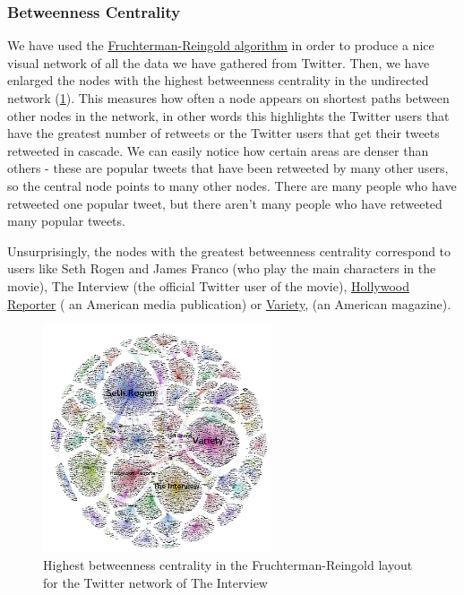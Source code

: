 \documentclass{llncs}
\begin{document}
\subsubsection{Betweenness Centrality}
We have used the
\href{https://en.wikipedia.org/wiki/Force-directed_graph_drawing}{Fruchterman-Reingold
algorithm} in order to produce a nice visual network of all the data we have
gathered from Twitter. Then, we have enlarged the nodes with the highest
betweenness centrality in the undirected network
(\ref{fig:interview-twitter-betweennes-centrality}). This measures how often a
node appears on shortest paths between other nodes in the network, in other
words this highlights the Twitter users that have the greatest number of
retweets or the Twitter users that get their tweets retweeted in cascade. We can
easily notice how certain areas are denser than others - these are popular
tweets that have been retweeted by many other users, so the central node points
to many other nodes. There are many people who have retweeted one popular tweet,
but there aren't many people who have retweeted many popular tweets.

Unsurprisingly, the nodes with the greatest betweenness centrality correspond to
users like Seth Rogen and James Franco (who play the main characters in the
movie), The Interview (the official Twitter user of the movie),
\href{http://en.wikipedia.org/wiki/The_Hollywood_Reporter}{Hollywood Reporter} (
an American media publication) or
\href{http://en.wikipedia.org/wiki/Variety_%28magazine%29 }{Variety}, (an
American magazine).
%
\begin{figure}
\centering
\includegraphics[width=0.6\textwidth]{interview-twitter-betweennes-centrality.png}
\caption{Highest betweenness centrality in the Fruchterman-Reingold layout for
the Twitter network of The Interview
\label{fig:interview-twitter-betweennes-centrality}}
\end{figure}
%
\end{document}
